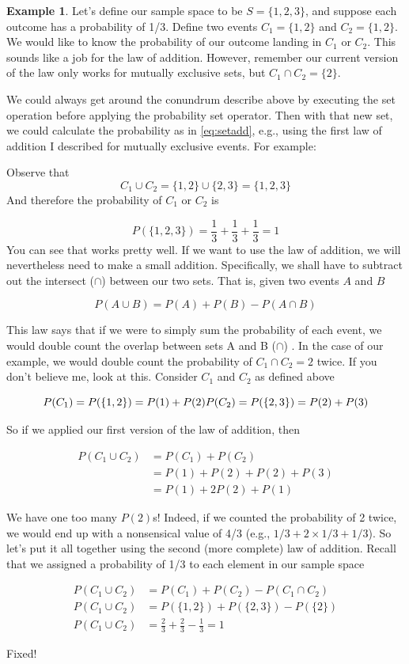 \documentclass[
]{book}
\theoremstyle{definition}
\theoremstyle{definition}
\newtheorem{example}{Example}[chapter]
\theoremstyle{definition}
\theoremstyle{definition}
\theoremstyle{remark}
\begin{document}
\begin{example}
Let's define our sample space to be \(S = \{1,2,3\}\), and suppose each outcome has a probability of 1/3. Define two events \(C_1 = \{1,2\}\) and \(C_2 = \{1,2\}\). We would like to know the probability of our outcome landing in \(C_1\) or \(C_2\). This sounds like a job for the law of addition. However, remember our current version of the law only works for mutually exclusive sets, but \(C_1 \cap C_2 = \{2\}\).

We could always get around the conundrum describe above by executing the set operation before applying the probability set operator. Then with that new set, we could calculate the probability as in \eqref{eq:setadd}, e.g., using the first law of addition I described for mutually exclusive events. For example:

Observe that
\[
C_1 \cup C_2 = \{1,2\} \cup \{2,3\} = \{1,2,3\}
\]
And therefore the probability of \(C_1\) or \(C_2\) is

\[
P(\{1,2,3\}) = \frac{1}{3} + \frac{1}{3} + \frac{1}{3} = 1
\]
You can see that works pretty well. If we want to use the law of addition, we will nevertheless need to make a small addition. Specifically, we shall have to subtract out the intersect (\(\cap\)) between our two sets. That is, given two events \(A\) and \(B\)

\[
P(A \cup B) = P(A) + P(B) - P(A \cap B)
\label{eq:additionnon}
\]

This law says that if we were to simply sum the probability of each event, we would double count the overlap between sets A and B (\(\cap\)) . In the case of our example, we would double count the probability of \(C_1 \cap C_2 = {2}\) twice. If you don't believe me, look at this. Consider \(C_1\) and \(C_2\) as defined above

\[
P(C_1) = P(\{1,2\}) = P(1) + P(2) \\
P(C_2) = P(\{2,3\}) = P(2) + P(3) \\
\]

So if we applied our first version of the law of addition, then

 
\begin{align}
P(C_1 \cup C_2) &= P(C_1) + P(C_2) \\
&= P(1) + P(2) + P(2) + P(3) \\
&= P(1) + 2P(2) + P(1)
\end{align}

We have one too many \(P(2)\)s! Indeed, if we counted the probability of 2 twice, we would end up with a nonsensical value of 4/3 (e.g., \(1/3 + 2 \times 1/3 + 1/3\)). So let's put it all together using the second (more complete) law of addition. Recall that we assigned a probability of 1/3 to each element in our sample space

\begin{align}
P(C_1 \cup C_2) &= P(C_1) + P(C_2) - P(C_1 \cap C_2) \\
P(C_1 \cup C_2) &= P(\{1,2\}) + P(\{2,3\}) - P(\{2\}) \\
P(C_1 \cup C_2) &= \frac{2}{3} + \frac{2}{3} - \frac{1}{3} = 1
\end{align}

Fixed!
\end{example}
\end{document}
